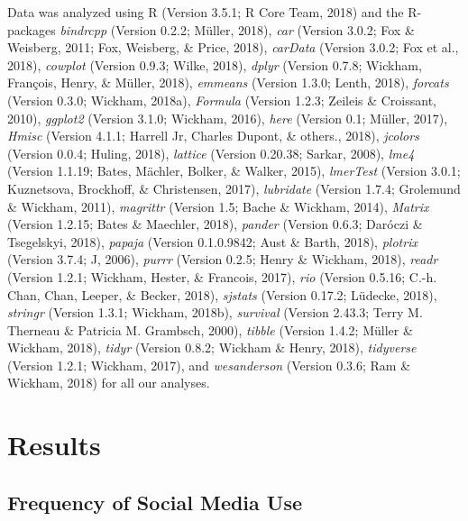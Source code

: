 \documentclass[man, fleqn, noextraspace]{apa6}
\theoremstyle{definition}
\theoremstyle{definition}
\theoremstyle{definition}
\theoremstyle{remark}
\begin{document}
Data was analyzed using R (Version 3.5.1; R Core Team, 2018) and the
R-packages \emph{bindrcpp} (Version 0.2.2; Müller, 2018), \emph{car}
(Version 3.0.2; Fox \& Weisberg, 2011; Fox, Weisberg, \& Price, 2018),
\emph{carData} (Version 3.0.2; Fox et al., 2018), \emph{cowplot}
(Version 0.9.3; Wilke, 2018), \emph{dplyr} (Version 0.7.8; Wickham,
François, Henry, \& Müller, 2018), \emph{emmeans} (Version 1.3.0; Lenth,
2018), \emph{forcats} (Version 0.3.0; Wickham, 2018a), \emph{Formula}
(Version 1.2.3; Zeileis \& Croissant, 2010), \emph{ggplot2} (Version
3.1.0; Wickham, 2016), \emph{here} (Version 0.1; Müller, 2017),
\emph{Hmisc} (Version 4.1.1; Harrell Jr, Charles Dupont, \& others.,
2018), \emph{jcolors} (Version 0.0.4; Huling, 2018), \emph{lattice}
(Version 0.20.38; Sarkar, 2008), \emph{lme4} (Version 1.1.19; Bates,
Mächler, Bolker, \& Walker, 2015), \emph{lmerTest} (Version 3.0.1;
Kuznetsova, Brockhoff, \& Christensen, 2017), \emph{lubridate} (Version
1.7.4; Grolemund \& Wickham, 2011), \emph{magrittr} (Version 1.5; Bache
\& Wickham, 2014), \emph{Matrix} (Version 1.2.15; Bates \& Maechler,
2018), \emph{pander} (Version 0.6.3; Daróczi \& Tsegelskyi, 2018),
\emph{papaja} (Version 0.1.0.9842; Aust \& Barth, 2018), \emph{plotrix}
(Version 3.7.4; J, 2006), \emph{purrr} (Version 0.2.5; Henry \& Wickham,
2018), \emph{readr} (Version 1.2.1; Wickham, Hester, \& Francois, 2017),
\emph{rio} (Version 0.5.16; C.-h. Chan, Chan, Leeper, \& Becker, 2018),
\emph{sjstats} (Version 0.17.2; Lüdecke, 2018), \emph{stringr} (Version
1.3.1; Wickham, 2018b), \emph{survival} (Version 2.43.3; Terry M.
Therneau \& Patricia M. Grambsch, 2000), \emph{tibble} (Version 1.4.2;
Müller \& Wickham, 2018), \emph{tidyr} (Version 0.8.2; Wickham \& Henry,
2018), \emph{tidyverse} (Version 1.2.1; Wickham, 2017), and
\emph{wesanderson} (Version 0.3.6; Ram \& Wickham, 2018) for all our
analyses.

\section{Results}\label{results}

\subsection{Frequency of Social Media
Use}\label{frequency-of-social-media-use}
\end{document}
